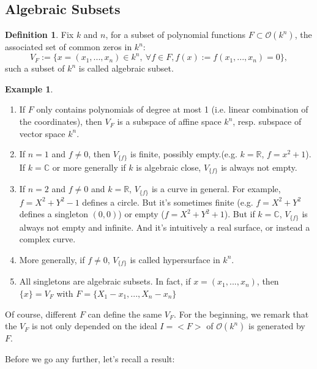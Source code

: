 \documentclass[12pt,a4paper,english]{article}
\theoremstyle{plain}
\theoremstyle{definition}
\newtheorem{defi}{Definition}
\newtheorem*{example}{Example}
\theoremstyle{remark}
\begin{document}
\subsection{Algebraic Subsets}
\begin{defi}
Fix $k$ and $n$, for a subset of polynomial functions $F\subset \mathcal{O}(k^{n})$, the associated set of common zeros in $k^{n}$:
\begin{equation*}
    V_{F}:=\{x=(x_{1},...,x_{n})\in k^{n},\ \forall f\in F, f(x):=f(x_{1},...,x_{n})=0\},
\end{equation*}
such a subset of $k^{n}$ is called algebraic subset.
\end{defi}
\begin{example}
\begin{enumerate}
    \item If $F$ only contains polynomials of degree at most 1 (i.e. linear combination of the coordinates), then $V_{F}$ is a subspace of affine space $k^{n}$, resp. subspace of vector space $k^{n}$.
    \item If $n=1$ and $f\not=0$, then $V_{\{f\}}$ is finite, possibly empty.(e.g. $k=\mathbb{R}$, $f=x^{2}+1$). If $k=\mathbb{C}$ or more generally if $k$ is algebraic close, $V_{\{f\}}$ is always not empty.
    \item If $n=2$ and $f\not =0$ and $k=\mathbb{R}$, $V_{\{f\}}$ is a curve in general. For example, $f=X^{2}+Y^{2}-1$ defines a circle. But it's sometimes finite (e.g. $f=X^{2}+Y^{2}$ defines a singleton $(0,0)$) or empty ($f=X^{2}+Y^{2}+1$). But if $k=\mathbb{C}$, $V_{\{f\}}$ is always not empty and infinite. And it's intuitively a real surface, or instead a complex curve. 
    \item More generally, if $f\not=0$, $V_{\{f\}}$ is called hypersurface in $k^{n}$.
    \item All singletons are algebraic subsets. In fact, if $x=(x_{1},...,x_{n})$, then $\{x\}=V_{F}$ with $F=\{X_{1}-x_{1},...,X_{n}-x_{n}\}$
\end{enumerate}
Of course, different $F$ can define the same $V_{F}$. For the beginning, we remark that the $V_{F}$ is not only depended on the ideal $I=<F>$ of $\mathcal{O}(k^{n})$ is generated by $F$.  
\end{example}
Before we go any further, let's recall a result:
\end{document}
